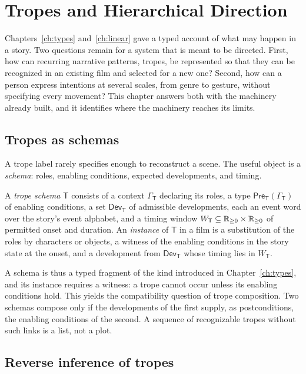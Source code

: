 \chapter{Tropes and Hierarchical Direction}
\label{ch:direction}

Chapters~\ref{ch:types} and~\ref{ch:linear} gave a typed account of what may happen in a story. Two questions remain for a system that is meant to be directed. First, how can recurring narrative patterns, tropes, be represented so that they can be recognized in an existing film and selected for a new one? Second, how can a person express intentions at several scales, from genre to gesture, without specifying every movement? This chapter answers both with the machinery already built, and it identifies where the machinery reaches its limits.

\section{Tropes as schemas}

A trope label rarely specifies enough to reconstruct a scene. The useful object is a \emph{schema}: roles, enabling conditions, expected developments, and timing.

\begin{definition}
A \emph{trope schema} $\mathsf{T}$ consists of a context $\Gamma_{\mathsf{T}}$ declaring its roles, a type $\mathsf{Pre}_{\mathsf{T}}(\Gamma_{\mathsf{T}})$ of enabling conditions, a set $\mathsf{Dev}_{\mathsf{T}}$ of admissible developments, each an event word over the story's event alphabet, and a timing window $W_{\mathsf{T}}\subseteq\mathbb{R}_{\ge0}\times\mathbb{R}_{\ge0}$ of permitted onset and duration. An \emph{instance} of $\mathsf{T}$ in a film is a substitution of the roles by characters or objects, a witness of the enabling conditions in the story state at the onset, and a development from $\mathsf{Dev}_{\mathsf{T}}$ whose timing lies in $W_{\mathsf{T}}$.
\end{definition}

A schema is thus a typed fragment of the kind introduced in Chapter~\ref{ch:types}, and its instance requires a witness: a trope cannot occur unless its enabling conditions hold. This yields the compatibility question of trope composition. Two schemas compose only if the developments of the first supply, as postconditions, the enabling conditions of the second. A sequence of recognizable tropes without such links is a list, not a plot.

\section{Reverse inference of tropes}

